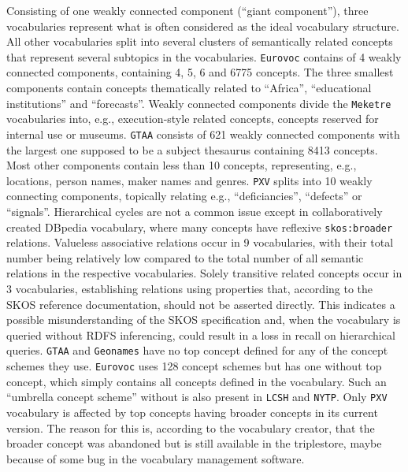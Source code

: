 Consisting of one weakly connected component (``giant component''), three vocabularies represent what is often considered as the ideal vocabulary structure. All other vocabularies split into several clusters of semantically related concepts that represent several subtopics in the vocabularies. \texttt{Eurovoc} contains of 4 weakly connected components, containing 4, 5, 6 and 6775 concepts. The three smallest components contain concepts thematically related to ``Africa'', ``educational institutions'' and ``forecasts''. Weakly connected components divide the \texttt{Meketre} vocabularies into, e.g., execution-style related concepts, concepts reserved for internal use or museums. \texttt{GTAA} consists of 621 weakly connected components with the largest one supposed to be a subject thesaurus containing 8413 concepts. Most  other components contain less than 10 concepts, representing, e.g., locations, person names, maker names and genres. \texttt{PXV} splits into 10 weakly connecting components, topically relating e.g., ``deficiancies'', ``defects'' or ``signals''.
Hierarchical cycles are not a common issue except in collaboratively created DBpedia vocabulary, where many concepts have reflexive \texttt{skos:broader} relations.
Valueless associative relations occur in 9 vocabularies, with their total number being relatively low compared to the total number of all semantic relations in the respective vocabularies.
Solely transitive related concepts occur in 3 vocabularies, establishing relations using properties that, according to the SKOS reference documentation, should not be asserted directly. This indicates a possible misunderstanding of the SKOS specification and, when the vocabulary is queried without RDFS inferencing, could result in a loss in recall on hierarchical queries.
\texttt{GTAA} and \texttt{Geonames} have no top concept defined for any of the concept schemes they use. \texttt{Eurovoc} uses 128 concept schemes but has one without top concept, which simply contains all concepts defined in the vocabulary. Such an ``umbrella concept scheme'' without is also present in \texttt{LCSH} and \texttt{NYTP}.
Only \texttt{PXV} vocabulary is affected by top concepts having broader concepts in its current version. The reason for this is, according to the vocabulary creator, that the broader concept was abandoned but is still available in the triplestore, maybe because of some bug in the vocabulary management software.

